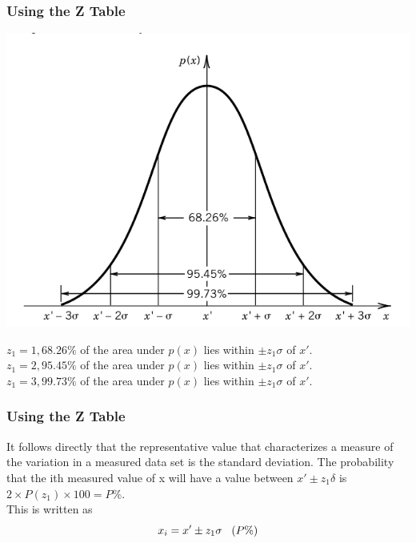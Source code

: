 \documentclass[fleqn]{beamer} %
\newcommand{\sectiontitleIII}{Using the Z Table}
\begin{document}
	\begin{frame}[label=sectionIII] \small
		\frametitle{\sectiontitleIII}    
	
		\includegraphics[scale=.250]{topic2_fig4.png}
		
		$ z_1=1, 68.26\% $ of the area under $ p(x) $ lies within $ \pm z_1\sigma $ of $ x' $.\\ 
		$ z_1=2, 95.45\% $ of the area under $ p(x) $ lies within $ \pm z_1\sigma $ of $ x' $.\\ 
		$ z_1=3, 99.73\% $ of the area under $ p(x) $ lies within $ \pm z_1\sigma $ of $ x' $.\\ 		
		

	\end{frame}
	
	\begin{frame}[label=sectionIII] \small
		\frametitle{\sectiontitleIII}    
	
		It follows directly that the representative value that characterizes a measure of the variation in a
measured data set is the standard deviation. The probability that the ith measured value of x will
have a value between $x' \pm z_1 \delta$ is $2 \times P(z_1) \times 100 = P\%$. \\

	This is written as \\
	
		\[ x_i = x' \pm z_1\sigma \hspace{3mm} (P\%) \]        
		
			

	\end{frame}
\end{document}
